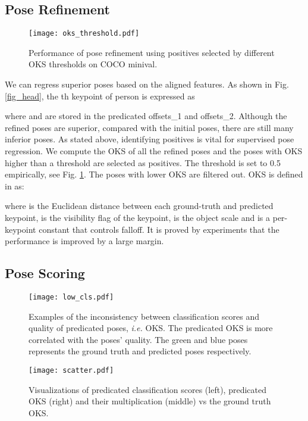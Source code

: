 \documentclass[11pt,twocolumn,journal]{IEEEtran}
\newcommand{\ie}{\emph{i.e.} }
\newcommand{\fig}{Fig. }
\begin{document}
\subsection{Pose Refinement}


\begin{figure}[t]
    \texttt{[image: oks\_threshold.pdf]}
    \caption{Performance of pose refinement using positives selected by  different OKS thresholds on COCO minival.}
    \label{fig_oks_filter}
\end{figure}

We can regress superior poses based on the aligned features. 
As shown in \fig\ref{fig_head}, the th keypoint of person  is expressed as

where  and  are stored in the predicated offsets\_1 and offsets\_2.
Although the refined poses are superior, compared with the initial poses, there are still many inferior poses. 
As stated above, identifying positives is vital for supervised pose regression. 
We compute the OKS of all the refined poses and the poses with OKS higher than a threshold are selected as positives. The threshold is set to 0.5 empirically, see \fig\ref{fig_oks_filter}.
The poses with lower OKS are filtered out. OKS is defined in \cite{coco14} as: 

where  is the Euclidean distance between each ground-truth and predicted keypoint,  is the visibility flag of the keypoint,  is the object scale and  is a per-keypoint constant that controls falloff. 
It is proved by experiments that the performance is improved by a large margin.  



\subsection{Pose Scoring}\label{psm}
\begin{figure}[t]
    \setlength{\belowcaptionskip}{-0.5cm}
    \centering
    \texttt{[image: low\_cls.pdf]}
\caption{Examples of the inconsistency between classification scores and quality of predicated poses, \ie OKS. The predicated OKS is more correlated with the poses' quality. The green and blue poses represents the ground truth and predicted poses respectively.
    }
    \label{fig:vis_PSM}
\end{figure}

\begin{figure*}[t]
\texttt{[image: scatter.pdf]}
\vspace{-6mm}
    \caption{Visualizations of predicated classification scores (left), predicated OKS (right) and their multiplication (middle) vs the ground truth OKS.}
    \label{fig:scatter}
\end{figure*}
\end{document}
